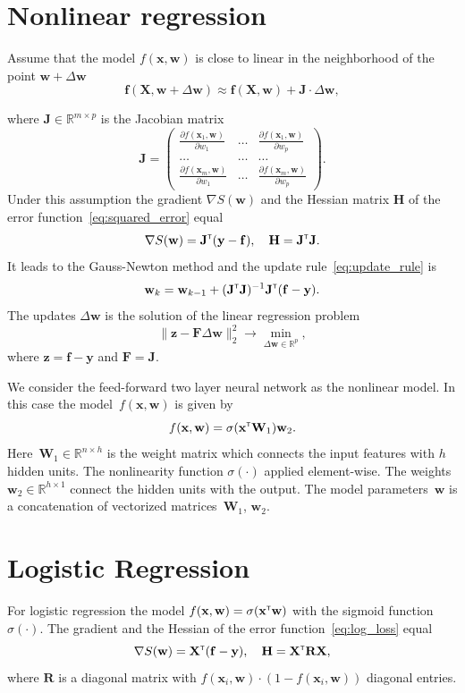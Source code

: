\documentclass[a4paper,12pt]{article}
\theoremstyle{plain} %
\theoremstyle{definition} %
\theoremstyle{remark} %
\newcommand{\bw}{\mathbf{w}}
\newcommand{\by}{\mathbf{y}}
\newcommand{\bx}{\mathbf{x}}
\newcommand{\bz}{\mathbf{z}}
\newcommand{\bJ}{\mathbf{J}}
\newcommand{\bbR}{\mathbb{R}}
\newcommand{\bW}{\mathbf{W}}
\newcommand{\bH}{\mathbf{H}}
\newcommand{\bF}{\mathbf{F}}
\newcommand{\bR}{\mathbf{R}}
\newcommand{\bX}{\mathbf{X}}
\newcommand{\T}{{\text{\tiny\sffamily\upshape\mdseries T}}}
\begin{document}
	\section*{Nonlinear regression}
	Assume that the model $f(\bx , \bw)$ is close to linear in the neighborhood of the point $\bw + \Delta \bw$
	\[
	\mathbf{f}(\bX , \bw + \Delta \bw) \approx \mathbf{f}(\bX , \bw) + \bJ \cdot \Delta  \bw,
	\]
	
	where $\mathbf{J} \in \bbR^{m \times p}$ is the Jacobian matrix
	\begin{equation}
		\bJ = 
		\begin{pmatrix}
		\frac{\partial f(\bx_1 , \bw)}{\partial w_1} & \dots & 
		\frac{\partial f(\bx_1 , \bw)}{\partial w_p} \\
		\dots & \dots & \dots \\
		\frac{\partial f(\bx_m , \bw)}{\partial w_1} & \dots & 
		\frac{\partial f(\bx_m , \bw)}{\partial w_p}
		\end{pmatrix}.
	\end{equation}
	Under this assumption the gradient $\nabla S(\bw)$ and the Hessian matrix $\bH$ of the error function~\eqref{eq:squared_error} equal
	\begin{equation}
		\nabla S(\bw) = \bJ^{\T} (\by - \mathbf{f}), \quad \bH = \bJ^{\T} \bJ.
		\label{eq:nonlin_reg_deriv}
	\end{equation}
	It leads to the Gauss-Newton method and the update rule~\eqref{eq:update_rule} is 
	\[
		\bw_k = \bw_{k - 1} + (\bJ^{\T} \bJ)^{-1}\bJ^{\T}(\mathbf{f} - \by).
	\]
	The updates $\Delta \bw$ is the solution of the linear regression problem
	\begin{equation}
		\| \bz - \bF \Delta \bw \|_2^2 \rightarrow \min_{\Delta \bw \in \bbR^{p}},
		\label{eq:lin_reg_nonlin_reg}
	\end{equation}
	where $\bz = \mathbf{f} - \by$ and $\bF = \bJ$.
	
	We consider the feed-forward two layer neural network as the nonlinear model. In this case the model~$f(\bx, \bw)$ is given by
	\[
	f(\bx, \bw) = \sigma(\bx^{\T} \bW_1) \bw_2.
	\]
	Here~$\bW_1 \in \bbR^{n \times h}$ is the weight matrix which connects the input features with $h$ hidden units. The nonlinearity function $\sigma(\cdot)$ applied element-wise. The weights $\bw_2 \in \bbR^{h \times 1}$ connect the hidden units with the output. 
	The model parameters~$\bw$ is a concatenation of vectorized matrices~$\bW_1$, $\bw_2$.
	
	\section*{Logistic Regression}
	For logistic regression the model $f(\bx , \bw) = \sigma(\bx^{\T} \bw)$ with the sigmoid function~$\sigma(\cdot)$.
	The gradient and the Hessian of the error function~\eqref{eq:log_loss} equal
	\begin{equation}
		\nabla S(\bw) = \bX^{\T} (\mathbf{f} - \by), \quad \bH = \bX^{\T} \bR \bX,
		\label{eq:log_reg_deriv}
	\end{equation}
	where $\bR$ is a diagonal matrix with $f(\bx_i , \bw) \cdot (1 - f(\bx_i , \bw))$ diagonal entries.
	
\end{document}

